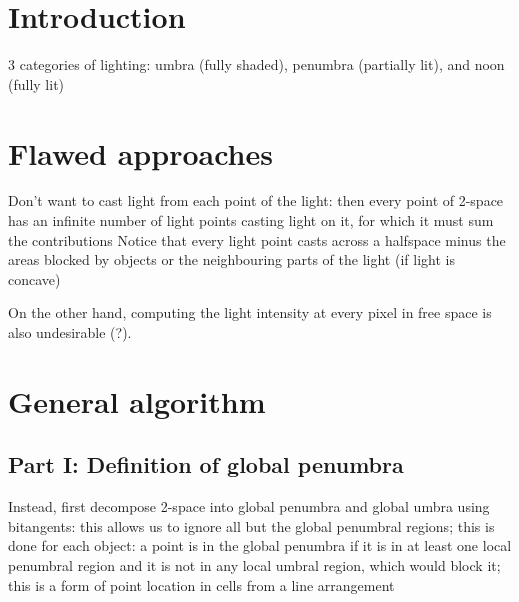 \documentclass[9pt,twocolumn]{article}
\begin{document}
			
\section{Introduction}

3 categories of lighting: umbra (fully shaded), penumbra (partially lit), 
	and noon (fully lit)

\section{Flawed approaches}

Don't want to cast light from each point of the light: 
	then every point of 2-space
	has an infinite number of light points casting light on it,
	for which it must sum the contributions
	Notice that every light point casts across a halfspace minus the
	areas blocked by objects or the neighbouring parts of the light (if
	light is concave)
	
On the other hand, computing the light intensity at every pixel
	in free space is also undesirable (?).
	
			
\section{General algorithm}

\subsection{Part I: Definition of global penumbra}

Instead, first decompose 2-space into global penumbra and global umbra using bitangents:
	this allows us to ignore all but the global penumbral regions;
	this is done for each object: a point is in the global penumbra
	if it is in at least one local penumbral region and it is not in any
	local umbral region, which would block it;
	this is a form of point location in cells from a line arrangement
			
\end{document}
